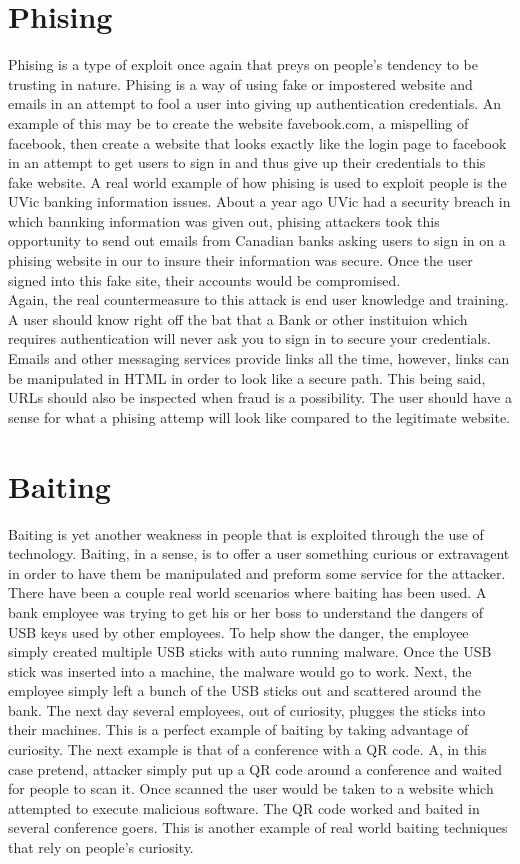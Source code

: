 \documentclass[paper=a4, fontsize=11pt]{scrartcl} %
\numberwithin{equation}{section} %
\numberwithin{figure}{section} %
\numberwithin{table}{section} %
\begin{document}
\section{Phising}
Phising is a type of exploit once again that preys on people's tendency to 
be trusting in nature. Phising is a way of using fake or impostered website
and emails in an attempt to fool a user into giving up authentication 
credentials. An example of this may be to create the website favebook.com,
a mispelling of facebook, then create a website that looks exactly like the
login page to facebook in an attempt to get users to sign in and thus give
up their credentials to this fake website. A real world example of how phising
is used to exploit people is the UVic banking information issues. About a year
ago UVic had a security breach in which bannking information was given out,
phising attackers took this opportunity to send out emails from Canadian banks
asking users to sign in on a phising website in our to insure their information
was secure. Once the user signed into this fake site, their accounts would
be compromised. \\

Again, the real countermeasure to this attack is end user knowledge and
training. A user should know right off the bat that a Bank or other
instituion which requires authentication will never ask you to sign in to
secure your credentials. Emails and other messaging services provide links
all the time, however, links can be manipulated in HTML in order to look
like a secure path. This being said, URLs should also be inspected when fraud
is a possibility. The user should have a sense for what a phising attemp 
will look like compared to the legitimate website.

\section{Baiting}
Baiting is yet another weakness in people that is exploited through the use
of technology. Baiting, in a sense, is to offer a user something curious or
extravagent in order to have them be manipulated and preform some service
for the attacker. There have been a couple real world scenarios where baiting
has been used. A bank employee was trying to get his or her boss to understand
the dangers of USB keys used by other employees. To help show the danger, the
employee simply created multiple USB sticks with auto running malware. Once
the USB stick was inserted into a machine, the malware would go to work. Next,
the employee simply left a bunch of the USB sticks out and scattered around
the bank. The next day several employees, out of curiosity, plugges the sticks
into their machines. This is a perfect example of baiting by taking advantage
of curiosity. The next example is that of a conference with a QR code. A,
in this case pretend, attacker simply put up a QR code around a conference
and waited for people to scan it. Once scanned the user would be taken to
a website which attempted to execute malicious software. The QR code worked
and baited in several conference goers. This is another example of real world
baiting techniques that rely on people's curiosity. \\
\end{document}
